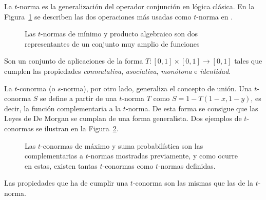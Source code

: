 La $t$-norma es la generalización del operador conjunción en lógica clásica. En la Figura~\ref{fig:t-norms} se describen las dos operaciones más usadas como $t$-norma en .

\begin{figure}
	\centering
	\qquad
	\caption[$t$-normas de mínimo y producto algebraico.]{Las $t$-normas de mínimo y producto algebraico son dos representantes de un conjunto muy amplio de funciones}
	\label{fig:t-norms}
\end{figure}

Son un conjunto de aplicaciones de la forma $T: [0, 1] \times [0, 1] \rightarrow [0, 1]$ tales que cumplen las propiedades \textit{conmutativa}, \textit{asociativa}, \textit{monótona} e \textit{identidad}.

La $t$-conorma (o $s$-norma), por otro lado, generaliza el concepto de unión. Una $t$-conorma $S$ se define a partir de una $t$-norma $T$ como $S = 1 - T(1-x, 1-y)$, es decir, la función complementaria a la $t$-norma. De esta forma se consigue que las Leyes de De Morgan se cumplan de una forma generalista. Dos ejemplos de $t$-conormas se ilustran en la Figura~\ref{fig:t-conorms}.

\begin{figure}
	\centering
	\qquad
	\caption[$t$-conormas de máximo y suma probabilística]{Las $t$-conormas de máximo y suma probabilística son las complementarias a $t$-normas mostradas previamente, y como ocurre en estas, existen tantas $t$-conormas como $t$-normas definidas.}
	\label{fig:t-conorms}
\end{figure}

Las propiedades que ha de cumplir una $t$-conorma son las mismas que las de la $t$-norma.

